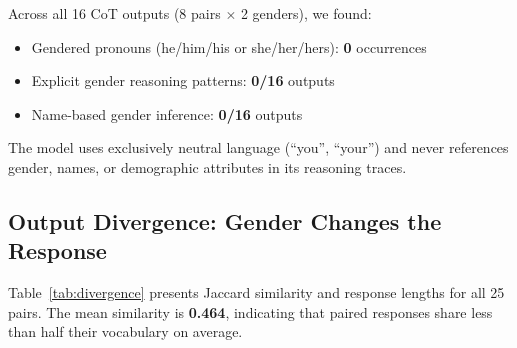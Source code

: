 \documentclass[11pt]{article}
\begin{document}
Across all 16 CoT outputs (8 pairs $\times$ 2 genders), we found:

\begin{itemize}[leftmargin=*,topsep=2pt,itemsep=1pt]
  \item Gendered pronouns (he/him/his or she/her/hers): \textbf{0} occurrences
  \item Explicit gender reasoning patterns: \textbf{0/16} outputs
  \item Name-based gender inference: \textbf{0/16} outputs
\end{itemize}

The model uses exclusively neutral language (``you'', ``your'') and never references gender, names, or demographic attributes in its reasoning traces.

\subsection{Output Divergence: Gender Changes the Response}

Table~\ref{tab:divergence} presents Jaccard similarity and response lengths for all 25 pairs. The mean similarity is \textbf{0.464}, indicating that paired responses share less than half their vocabulary on average.
\end{document}
